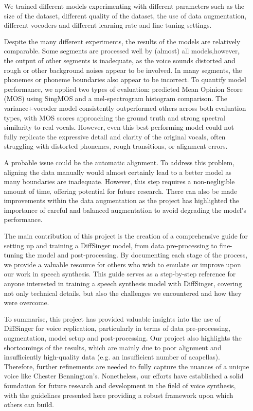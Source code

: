 \documentclass[a4paper]{article}
\begin{document}
	We trained different models experimenting with different parameters such as the size of the dataset, different quality of the dataset, the use of data augmentation, different vocoders and different learning rate and fine-tuning settings.
	
	
	Despite the many different experiments, the results of the models are relatively comparable. Some segments are processed well by (almost) all models,however, the output of other segments is inadequate, as the voice sounds distorted and rough or other background noises appear to be involved. In many segments, the phonemes or phoneme boundaries also appear to be incorrect. To quantify model performance, we applied two types of evaluation: predicted Mean Opinion Score (MOS) using SingMOS and a mel-spectrogram histogram comparison. The variance+vocoder model consistently outperformed others across both evaluation types, with MOS scores approaching the ground truth and strong spectral similarity to real vocals. However, even this best-performing model could not fully replicate the expressive detail and clarity of the original vocals, often struggling with distorted phonemes, rough transitions, or alignment errors. 
	
	A probable issue could be the automatic alignment. To address this problem, aligning the data manually would almost certainly lead to a better model as many boundaries are inadequate. However, this step requires a non-negligible amount of time, offering potential for future research. There can also be made improvements within the data augmentation as the project has highlighted the importance of careful and balanced augmentation to avoid degrading the model’s performance.
	
	The main contribution of this project is the creation of a comprehensive guide for setting up and training a DiffSinger model, from data pre-processing to fine-tuning the model and post-processing. By documenting each stage of the process, we provide a valuable resource for others who wish to emulate or improve upon our work in speech synthesis. This guide serves as a step-by-step reference for anyone interested in training a speech synthesis model with DiffSinger, covering not only technical details, but also the challenges we encountered and how they were overcome.
	
	
	To summarise, this project has provided valuable insights into the use of DiffSinger for voice replication, particularly in terms of data pre-processing, augmentation, model setup and post-processing. Our project also highlights the shortcomings of the results, which are mainly due to poor alignment and insufficiently high-quality data (e.g. an insufficient number of acapellas).  Therefore, further refinements are needed to fully capture the nuances of a unique voice like Chester Bennington's. Nonetheless, our efforts have established a solid foundation for future research and development in the field of voice synthesis, with the guidelines presented here providing a robust framework upon which others can build.
	
	
	
	
	
\end{document}
